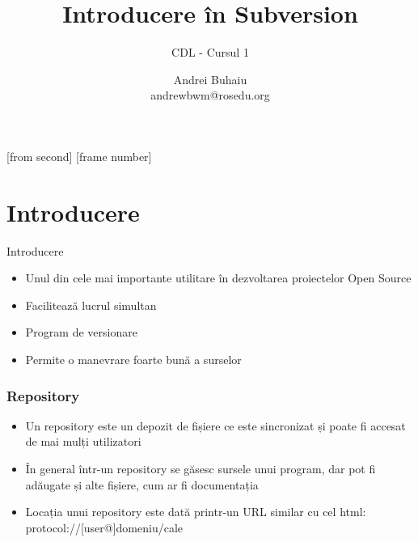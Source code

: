 \documentclass{beamer}
\title[SVN]{Introducere \^in Subversion}
\subtitle{CDL - Cursul 1}
\institute{ROSEdu}
\author{Andrei Buhaiu\\{\footnotesize andrewbwm@rosedu.org}}
\begin{document}
[from second]
[frame number]

\frame{\titlepage}

\frame{\tableofcontents}

\section{Introducere}

\frame{\tableofcontents[currentsection]}

\begin{frame}{Introducere}
\begin{itemize} %
\item Unul din cele mai importante utilitare în dezvoltarea proiectelor Open Source
\newline 
\item Facilitează lucrul simultan
\newline 
\item Program de versionare
\newline 
\item Permite o manevrare foarte bună a surselor
\end{itemize}
\end{frame}

\begin{frame}[allowframebreaks] %
\frametitle{Repository}
\begin{itemize}
\item Un repository este un depozit de fișiere ce este sincronizat și poate fi accesat de mai mulți utilizatori
\newline 
\item În general într-un repository se găsesc sursele unui program, dar pot fi adăugate și alte fișiere, cum  ar fi documentația
\newline 
\item Locația unui repository este dată printr-un URL similar cu cel html: protocol://[user@]domeniu/cale
\end{itemize}
\end{frame}
\end{document}
